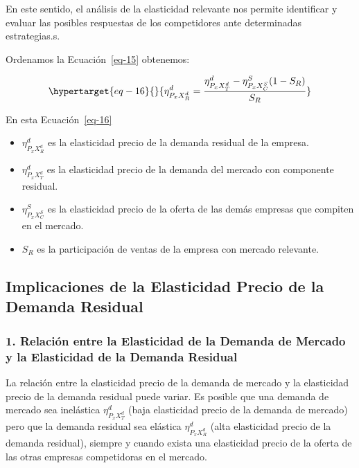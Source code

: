 \documentclass[
  a4paper,
]{article}
\begin{document}
En este sentido, el análisis de la elasticidad relevante nos permite
identificar y evaluar las posibles respuestas de los competidores ante
determinadas estrategias.s.

Ordenamos la Ecuación~\ref{eq-15} obtenemos:

\begin{equation}\protect\hypertarget{eq-16}{}{
\eta_{P_{x}X_R^d}^d = \frac{\eta_{P_{x}X_T^d}^d - \eta_{P_{x}X_C^S}^{S} (1-S_R)}{S_R}
}\label{eq-16}\end{equation}

En esta Ecuación~\ref{eq-16}

\begin{itemize}
\item
  \(\eta_{P_{x}X_R^d}^d\) es la elasticidad precio de la demanda
  residual de la empresa.
\item
  \(\eta_{P_{x}X_T^d}^d\) es la elasticidad precio de la demanda del
  mercado con componente residual.
\item
  \(\eta_{P_{x}X_C^S}^S\) es la elasticidad precio de la oferta de las
  demás empresas que compiten en el mercado.
\item
  \(S_R\) es la participación de ventas de la empresa con mercado
  relevante.
\end{itemize}

\hypertarget{implicaciones-de-la-elasticidad-precio-de-la-demanda-residual}{%
\subsection{Implicaciones de la Elasticidad Precio de la Demanda
Residual}\label{implicaciones-de-la-elasticidad-precio-de-la-demanda-residual}}

\hypertarget{relaciuxf3n-entre-la-elasticidad-de-la-demanda-de-mercado-y-la-elasticidad-de-la-demanda-residual}{%
\subsubsection{1. Relación entre la Elasticidad de la Demanda de Mercado
y la Elasticidad de la Demanda
Residual}\label{relaciuxf3n-entre-la-elasticidad-de-la-demanda-de-mercado-y-la-elasticidad-de-la-demanda-residual}}

La relación entre la elasticidad precio de la demanda de mercado y la
elasticidad precio de la demanda residual puede variar. Es posible que
una demanda de mercado sea inelástica \(\eta_{P_{x}X_T^d}^d\) (baja
elasticidad precio de la demanda de mercado) pero que la demanda
residual sea elástica \(\eta_{P_{x}X_R^d}^d\) (alta elasticidad precio
de la demanda residual), siempre y cuando exista una elasticidad precio
de la oferta de las otras empresas competidoras en el mercado.
\end{document}
